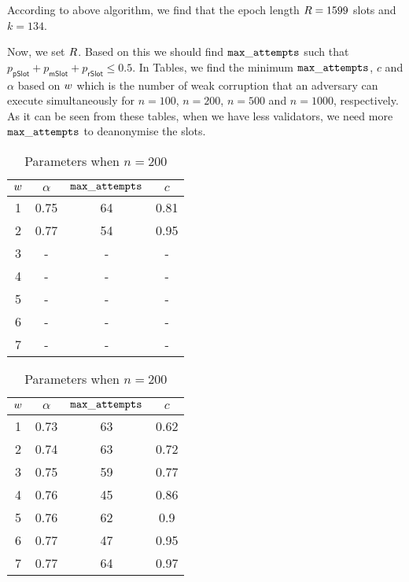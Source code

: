 According to above algorithm, we find that the epoch length $ R = 1599 $ slots and $ k = 134 $.

Now, we set $ R $. Based on this we should find $ \mathtt{max\_attempts} $ such that $ p_{\mathsf{pSlot}} + p_\mathsf{mSlot} + p_\mathsf{rSlot} \leq 0.5$. In Tables,  we find the minimum $ \mathtt{max\_attempts} $, $ c $ and $ \alpha $ based on $ w $ which is the number of weak corruption that an adversary can execute simultaneously for $ n = 100 $, $ n = 200 $, $ n = 500 $ and $ n =1000 $, respectively. As it can be seen from these tables, when we have less validators, we need more $ \mathtt{max\_attempts} $ to deanonymise the slots.



	\begin{table}
	\parbox{.45\linewidth}{
		\centering
		\begin{tabular}{|c|c|c|c|}
			\hline
			$ w $ & $ \alpha $ & $ \mathtt{max\_attempts} $& $ c $  \\\hline
			1&0.75&64&0.81
			\\\hline
			2&0.77&54&0.95
			\\\hline
			
			3&-&-&-
			\\\hline
			
			4&-&-&-
			\\\hline
			
			5&-&-&-
			\\\hline
			
			6&-&-&-
			\\\hline
			7&-&-&-
			\\\hline
		\end{tabular}
		\caption{Parameters when $ n = 100 $}}
		\label{tb:param100}
\hfill
		\parbox{.45\linewidth}{
		\centering
		\begin{tabular}{|c|c|c|c|}
			\hline
			$ w $ & $ \alpha $ & $ \mathtt{max\_attempts} $& $ c $  \\\hline
			1&0.73&63&0.62
			\\\hline
			2&0.74&63&0.72
			\\\hline
			3&0.75&59&0.77
			\\\hline
			4&0.76&45&0.86
			\\\hline
			5&0.76&62&0.9
			\\\hline
			6&0.77&47&0.95
			\\\hline
			7&0.77&64&0.97
			\\\hline
		\end{tabular}
		\caption{Parameters when $ n = 200 $}
		\label{tb:param200}}
	\end{table}



